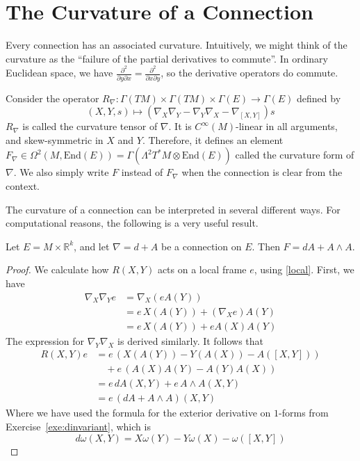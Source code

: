 \section{The Curvature of a Connection}\label{sec:connection-curvature}

Every connection has an associated curvature. Intuitively, we might think of the curvature as the ``failure of the partial derivatives to commute''. In ordinary Euclidean space, we have $\frac{\partial^2}{\partial y\partial x}=\frac{\partial^2}{\partial x\partial y}$, so the derivative operators do commute.
\begin{definition}
  Consider the operator $R_\nabla:\Gamma(TM)\times\Gamma(TM)\times\Gamma(E)\to\Gamma(E)$ defined by
  $$(X,Y,s)\mapsto(\nabla_X\nabla_Y-\nabla_Y\nabla_X-\nabla_{[X,Y]})s$$
  $R_\nabla$ is called the curvature tensor of $\nabla$. It is $C^\infty(M)$-linear in all arguments, and skew-symmetric in $X$ and $Y$. Therefore, it defines an element $F_\nabla\in\Omega^2(M,\text{End}(E))=\Gamma(\Lambda^2T^*M\otimes\text{End}(E))$ called the curvature form of $\nabla$. We also simply write $F$ instead of $F_\nabla$ when the connection is clear from the context.
\end{definition}
The curvature of a connection can be interpreted in several different ways. For computational reasons, the following is a very useful result.
\begin{theorem}\label{cartan}
  Let $E=M\times\mathbb{R}^k$, and let $\nabla=d+A$ be a connection on $E$. Then $F=dA+A\wedge A$.
\end{theorem}
\begin{proof}
  We calculate how $R(X,Y)$ acts on a local frame $e$, using \ref{local}. First, we have
  \begin{align*}
    \nabla_X\nabla_Ye &=\nabla_X(eA(Y)) \\
                      &=e\,X(A(Y))+(\nabla_Xe)A(Y) \\
                      &=e\,X(A(Y))+eA(X)A(Y)
  \end{align*}
  The expression for $\nabla_Y\nabla_X$ is derived similarly. It follows that
  \begin{align*}
    R(X,Y)e &= e\,(X(A(Y))-Y(A(X))-A([X,Y])) \\
            &\quad +e\,(A(X)A(Y)-A(Y)A(X))\\
            &= e\,dA(X,Y)+e\,A\wedge A(X,Y) \\
            &= e\,(dA+A\wedge A)(X,Y)
  \end{align*}
  Where we have used the formula for the exterior derivative on $1$-forms from Exercise~\ref{exe:dinvariant}, which is $$d\omega(X,Y)=X\omega(Y)-Y\omega(X)-\omega([X,Y])$$
\end{proof}
